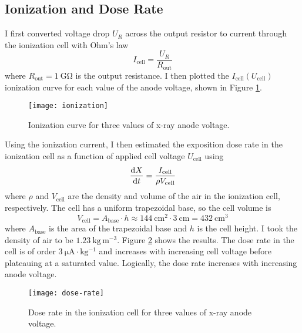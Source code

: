 \documentclass[11pt, a4paper]{article}
\begin{document}
\subsection{Ionization and Dose Rate}
I first converted voltage drop $ U_{R} $ across the output resistor to current through the ionization cell with Ohm's law
\begin{equation*}
	I_{\text{cell}} = \frac{U_{R}}{R_{\text{out}}}
\end{equation*}
where $ R_{\text{out}} = \SI{1}{\giga \ohm} $ is the output resistance. I then plotted the $ I_{\text{cell}}(U_{\text{cell}}) $ ionization curve for each value of the anode voltage, shown in Figure \ref{xray:fig:ionization}. 
\begin{figure}
	\texttt{[image: ionization]}
	\caption{Ionization curve for three values of x-ray anode voltage.}
	\label{xray:fig:ionization}
\end{figure}
Using the ionization current, I then estimated the exposition dose rate in the ionization cell as a function of applied cell voltage $ U_{\text{cell}} $ using
\begin{equation*}
	\dv{X}{t} = \frac{I_{\text{cell}}}{\rho V_{\text{cell}}}
\end{equation*}
where $\rho$ and $ V_{\text{cell}} $ are the density and volume of the air in the ionization cell, respectively. The cell has a uniform trapezoidal base, so the cell volume is
\begin{equation*}
	V_{\text{cell}} = A_{\text{base}} \cdot h \approx \SI{144}{\centi \meter^{2}} \cdot \SI{3}{\centi \meter} = \SI{432}{\centi \meter^{3}}
\end{equation*}
where $ A_{\text{base}} $ is the area of the trapezoidal base and $ h $ is the cell height. I took the density of air to be $ \SI{1.23}{\kilogram \, \meter^{-3}} $. Figure \ref{xray:fig:dose-rate} shows the results. The dose rate in the cell is of order $ \SI{3}{\micro \ampere \cdot \kilogram^{-1}} $ and increases with increasing cell voltage before plateauing at a saturated value. Logically, the dose rate increases with increasing anode voltage.

\begin{figure}
	\texttt{[image: dose-rate]}
	\caption{Dose rate in the ionization cell for three values of x-ray anode voltage.}
	\label{xray:fig:dose-rate}
\end{figure}
\end{document}
